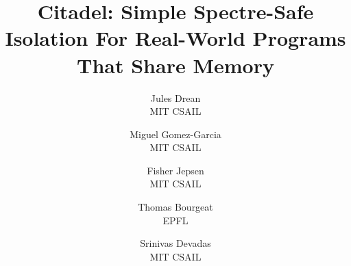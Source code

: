 \newcommand{\uarch}[3][]{{\color{semanticsred}\{\!\!|}#2{\color{semanticsred}|\!\!\}_{#1}^{#3}}}
\newcommand{\uarchf}[3][]{{\color{semanticsredf}\{\!\!|}#2{\color{semanticsredf}|\!\!\}_{#1}^{#3}}}

\newcommand{\contract}[3][]{{\color{semanticsgreen}\llbracket}#2{\color{semanticsgreen}\rrbracket_{#1}^{#3}}}


\newcommand{\hw}[1]{{\color{semanticsred}#1}}
\newcommand{\sw}[1]{{\color{semanticsgreen}#1}}

\newif\ifdraft %
\draftfalse
\newcommand{\jules}[1]{\ifdraft{{\color{blue}Jules: #1}}\fi}
\newcommand{\thomas}[1]{\ifdraft{{\color{orange}Thomas: #1}}\fi}
\newcommand{\bthom}[1]{\ifdraft{{\color{orange}Thomas: #1}}\fi}
\newcommand{\fisher}[1]{\ifdraft{{\color{blue}[Fisher: #1]}}\fi}
\newcommand{\TODO}[1]{\ifdraft{{\color{orange}[TODO: #1]}}\fi}
\newcommand{\srini}[1]{\ifdraft{\textcolor{red}{Srini: #1}}\fi}
\newcommand{\mengjia}[1]{\ifdraft{\textcolor{orange}{Mengjia: #1}}\fi}
\newcommand{\jon}[1]{\ifdraft{{\color{blue}[Jon: #1]}}\fi}

\newcommand{\MemExePipeline}{MemExePipeline}
\newcommand{\MemRS}{MemRS}

\newcommand{\prob}{$\mathcal{P}$}



\newcommand{\ydistance}{1}
\newcommand{\yoffset}{0.5}
\newcommand{\xdistance}{1}



\date{}

\title{Citadel: Simple Spectre-Safe Isolation For Real-World Programs \\ That Share Memory}

\author{
 {\rm Jules Drean}\\
 MIT CSAIL
\and
{\rm Miguel Gomez-Garcia}\\
MIT CSAIL
\and
{\rm Fisher Jepsen}\\
MIT CSAIL
\and
{\rm Thomas Bourgeat}\\
EPFL
\and
{\rm Srinivas Devadas}\\
MIT CSAIL
 } %

